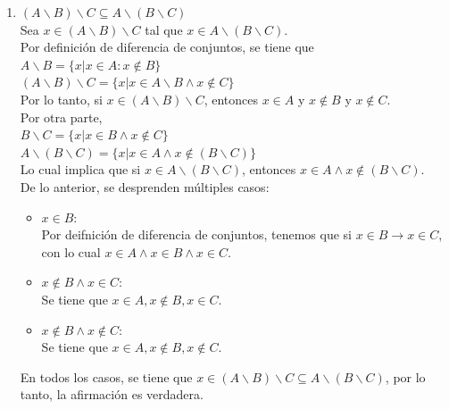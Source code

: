 \documentclass[12pt]{article}
\begin{document}
\begin{enumerate}
    
    \item $(A \backslash B) \backslash C \subseteq  A \backslash (B \backslash C)$\\
    Sea $x \in (A \backslash B) \backslash C$ tal que $x \in A \backslash (B \backslash C)$.\\
    
    Por definición de diferencia de conjuntos, se tiene que \\
    $A \backslash B = \{x | x \in A : x \notin B\}$\\
    $(A \backslash B) \backslash C = \{x | x \in A \backslash B \wedge  x \notin C\}$\\
    
    Por lo tanto, si $x \in (A \backslash B) \backslash C$, entonces $x \in A$ y $x \notin B$ y $x \notin C$.\\
    Por otra parte,\\
    
    $B \backslash C = \{x | x \in B \wedge x \notin C\}$\\
    $A \backslash (B \backslash C) = \{x | x \in A \wedge x \notin (B \backslash C)\}$\\    
    
    Lo cual implica que si $x \in A \backslash (B \backslash C)$, entonces $x \in A \wedge x \notin (B \backslash C)$.\\
    De lo anterior, se desprenden múltiples casos:
    \begin{itemize}
        \item $x \in B$:\\
        Por deifnición de diferencia de conjuntos, tenemos que si $x \in B \rightarrow x \in C$,\\
        con lo cual $x \in A \wedge x \in B \wedge x \in C$.

        \item $x \notin B \wedge x \in C$:\\
        Se tiene que $x \in A, x \notin B, x \in C$.

        \item $x \notin B \wedge x \notin C$:\\
        Se tiene que $x \in A, x \notin B, x \notin C$.

    \end{itemize}

    En todos los casos, se tiene que $x \in (A \backslash B) \backslash C \subseteq  A \backslash (B \backslash C)$, 
    por lo tanto, la afirmación es verdadera.




\end{enumerate}
\end{document}
